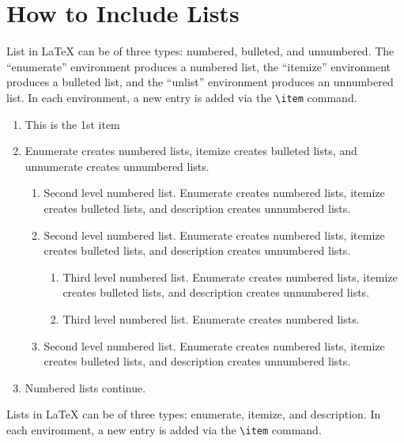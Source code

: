 \documentclass[12pt,a4paper]{article}
\begin{document}
\section{How to Include Lists}\label{sec7}

List in \LaTeX{} can be of three types: numbered, bulleted, and unnumbered. The ``enumerate'' environment produces a numbered list, the 
``itemize'' environment produces a bulleted list, and the ``unlist''
environment produces an unnumbered list.
In each environment, a new entry is added via the \verb+\item+ command.

\begin{enumerate}[label=\arabic*.]
\item This is the 1st item
\item Enumerate creates numbered lists, itemize creates bulleted lists, and unnumerate creates unnumbered lists.

\begin{enumerate}[label=\alph*.]
\item Second level numbered list. Enumerate creates numbered lists, itemize creates bulleted lists, and description creates unnumbered lists.
\item Second level numbered list. Enumerate creates numbered lists, itemize creates bulleted lists, and description creates unnumbered lists.

\begin{enumerate}[label=(\roman*)]
\item Third level numbered list. Enumerate creates numbered lists, itemize creates bulleted lists, and description creates unnumbered lists.
\item Third level numbered list. Enumerate creates numbered lists.
\end{enumerate}

\item Second level numbered list. Enumerate creates numbered lists, itemize creates bulleted lists, and description creates unnumbered lists.
\end{enumerate}

\item Numbered lists continue.
\end{enumerate}
Lists in \LaTeX{} can be of three types: enumerate, itemize, and description.
In each environment, a new entry is added via the \verb+\item+ command.
\end{document}
